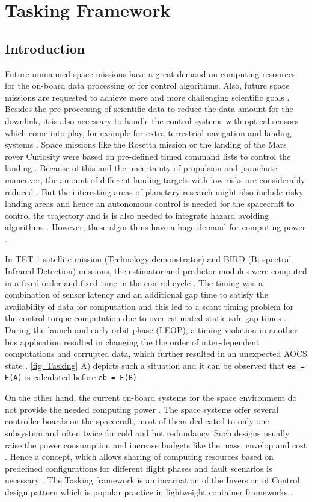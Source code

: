 
\chapter{Tasking Framework}
\section{Introduction}
Future unmanned space missions have a great demand on computing resources for the on-board data processing or for control algorithms. Also, future space missions are requested to achieve more and more challenging scientific goals \cite{PhdThesis}. Besides the pre-processing of scientific data to reduce the data amount for the downlink, it is also necessary to handle the control systems with optical sensors which come into play, for example for extra terrestrial navigation and landing systems \cite{ATON}. Space missions like the Rosetta mission or the landing of the Mars rover Curiosity were based on pre-defined timed command lists to control the landing \cite{TaskFr}. Because of this and the uncertainty of propulsion and parachute maneuver, the amount of different landing targets with low risks are considerably reduced \cite{TaskFr}. But the interesting areas of planetary research might also include risky landing areas and hence an autonomous control is needed for the spacecraft to control the trajectory and is is also needed to integrate hazard avoiding algorithms \cite{ATON}. However, these algorithms have a huge demand for computing power \cite{TaskFr}. 

In TET-1 satellite mission (Technology demonstrator) and BIRD (Bi-spectral Infrared Detection) missions, the estimator and predictor modules were computed in a fixed order and fixed time in the control-cycle \cite{TETBIRD}. The timing was a combination of sensor latency and an additional gap time to satisfy the availability of data for computation and this led to a scant timing problem for the control torque computation due to over-estimated static safe-gap times \cite{TETBIRD}\cite{TETtoEUCROPIS}. During the launch and early orbit phase (LEOP), a timing violation in another bus application resulted in changing the the order of inter-dependent computations and corrupted data, which further resulted in an unexpected AOCS state \cite{TETBIRD}. \cref{fig: Tasking} A) depicts such a situation and it can be observed that \texttt{ea = E(A)} is calculated before \texttt{eb = E(B)} 

On the other hand, the current on-board systems for the space environment do not provide the needed computing power \cite{TaskFr}. The space systems offer several controller boards on the spacecraft, most of them dedicated to only one subsystem and often twice for cold and hot redundancy. Such designs usually raise the power consumption and increase budgets like the mass, envelop and cost \cite{TaskFr}. Hence a concept, which allows sharing of computing resources based on predefined configurations for different flight phases and fault scenarios is necessary \cite{TaskFr}. The Tasking framework is an incarnation of the Inversion of Control design pattern which is popular practice in lightweight container frameworks \cite{InvOfCntrlurl}. 

